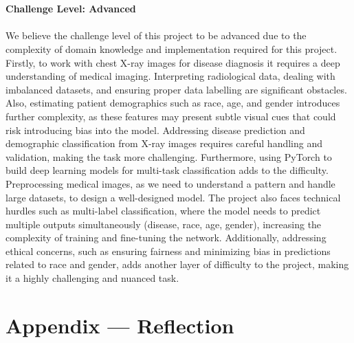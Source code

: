 \documentclass{article}
\begin{document}
\\ \\ 
\textbf{Challenge Level: Advanced} \\ \\ 
We believe the challenge level of this project to be advanced due to the complexity of domain knowledge and implementation required for this project. Firstly, to work with chest X-ray images for disease diagnosis it requires a deep understanding of medical imaging. Interpreting radiological data, dealing with imbalanced datasets, and ensuring proper data labelling are significant obstacles. Also, estimating patient demographics such as race, age, and gender introduces further complexity, as these features may present subtle visual cues that could risk introducing bias into the model. Addressing disease prediction and demographic classification from X-ray images requires careful handling and validation, making the task more challenging.
Furthermore, using PyTorch to build deep learning models for multi-task classification adds to the difficulty. Preprocessing medical images, as we need to understand a pattern and handle large datasets, to design a well-designed model. The project also faces technical hurdles such as multi-label classification, where the model needs to predict multiple outputs simultaneously (disease, race, age, gender), increasing the complexity of training and fine-tuning the network. Additionally, addressing ethical concerns, such as ensuring fairness and minimizing bias in predictions related to race and gender, adds another layer of difficulty to the project, making it a highly challenging and nuanced task.

\newpage{}

\section*{Appendix --- Reflection}
\end{document}
